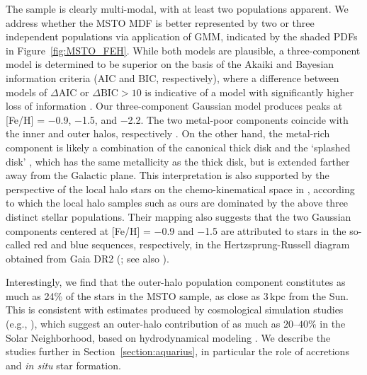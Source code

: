 \documentclass[twocolumn,trackchanges]{aastex63}
\begin{document}
The sample is clearly multi-modal, with at least two populations apparent. We address whether the MSTO MDF is better represented by two or three independent populations via application of GMM, indicated by the shaded PDFs in Figure~\ref{fig:MSTO_FEH}. While both models are plausible, a three-component model is determined to be superior on the basis of the Akaiki and Bayesian information criteria (AIC and BIC, respectively), where a difference between models of $\Delta \textrm{AIC}$ or $\Delta \textrm{BIC} > 10$ is indicative of a model with significantly higher loss of information \citep{Kass:1995}. 
%
Our three-component Gaussian model produces peaks at [Fe/H] = $-$0.9, $-$1.5, and $-$2.2. The two metal-poor components coincide with the inner and outer halos, respectively \citep{Chiba_2000, Carollo:2007,Carollo:2010,Beers:2012,dietz2020}. On the other hand, the metal-rich component is likely a combination of the canonical thick disk and the `splashed disk' \citep{bonaca2017,belokurov2020}, which has the same metallicity as the thick disk, but is extended farther away from the Galactic plane. This interpretation is also supported by the perspective of the local halo stars on the chemo-kinematical space in \citet{an2020,an2021}, according to which the local halo samples such as ours are dominated by the above three distinct stellar populations. Their mapping also suggests that the two Gaussian components centered at [Fe/H] = $-$0.9 and $-$1.5 are attributed to stars in the so-called red and blue sequences, respectively, in the Hertzsprung-Russell diagram obtained from Gaia DR2 (\citealt{gaia2018hrd}; see also \citealt{sahlholdt2019}).


Interestingly, we find that the outer-halo population component constitutes as much as 24\% of the stars in the MSTO sample, as close as 3\,kpc from the Sun. This is consistent with estimates produced by cosmological simulation studies (e.g., \citealt{Tissera:2014}), which suggest an outer-halo contribution of as much as $20 \mbox{--}40$\% in the Solar Neighborhood, based on hydrodynamical modeling \citep{Scannapieco:2009}. We describe the \citet{Tissera:2012,Tissera:2013,Tissera:2014} studies further in Section~\ref{section:aquarius}, in particular the role of accretions and \textit{in situ} star formation. 
\end{document}
